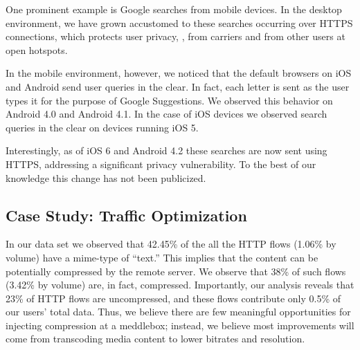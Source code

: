 One prominent example is Google searches from mobile devices. In the 
desktop environment, we have grown accustomed to these searches 
occurring over HTTPS connections, which protects user privacy, \eg, from 
carriers and from other users at open \wifi hotspots. 

In the mobile environment, however, we noticed that the default 
browsers on iOS and Android send user queries in the clear. In fact, 
each letter is sent as the user types it for the purpose of Google Suggestions. 
We
observed this behavior on Android 4.0 and Android 4.1. In the case of iOS devices we observed search queries
in the clear on devices running iOS 5. 

Interestingly, as of iOS 6 and Android 4.2 these searches are now sent using HTTPS, addressing 
a significant privacy vulnerability. To the best of our knowledge this 
change has not been publicized. 

%




\subsection{Case Study: Traffic Optimization}
\label{sec:case-study-compression}

In our data set we observed that 42.45\% of the all the HTTP flows (1.06\% by volume) have 
a mime-type of ``text.'' This implies that the content can be potentially compressed by the 
remote server. We observe that 38\% of such flows (3.42\% by volume) are, in fact, compressed. 
Importantly, our analysis reveals that 23\% of HTTP flows are uncompressed, and these flows 
contribute only 0.5\% of our users' total data. Thus, we believe there are few meaningful 
opportunities for injecting compression at a meddlebox; instead, we believe most improvements 
will come from transcoding media content to lower bitrates and resolution. 

